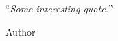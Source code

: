 \newpage
\vspace*{0.2\textheight}

\noindent\enquote{\itshape Some interesting quote.}\bigbreak

\hfill Author